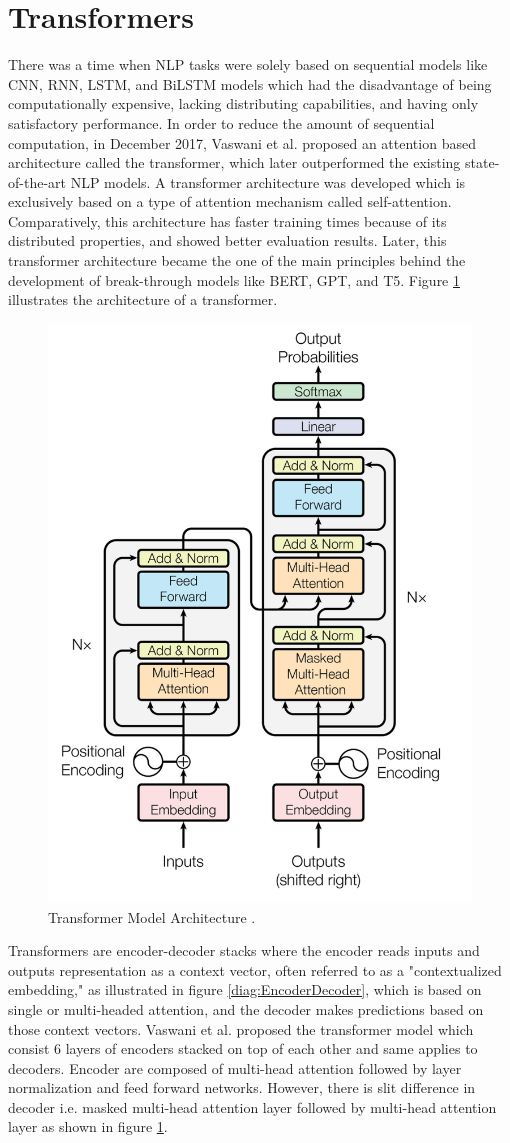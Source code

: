 \documentclass[%
	BCOR=8mm, %
	DIV=12,
	toc=bibliography, %
	toc=listof, %
	oneside, %
	egregdoesnotlikesansseriftitles, %
	]{scrbook}
\begin{document}
\section{Transformers}
\label{section: transformers}
There was a time when NLP tasks were solely based on sequential models like CNN, RNN, LSTM, and BiLSTM models which had the disadvantage of being computationally expensive, lacking distributing capabilities, and having only satisfactory performance. In order to reduce the amount of sequential computation, in December 2017, Vaswani et al. \cite{vaswani_attention_2017} proposed an attention based architecture called the transformer, which later outperformed the existing state-of-the-art NLP models. A transformer architecture was developed which is exclusively based on a type of attention mechanism called self-attention. Comparatively, this architecture has faster training times because of its distributed properties, and showed better evaluation results. 
Later, this transformer architecture became the one of the main principles behind the development of break-through models like BERT, GPT, and T5. Figure \ref{diag:TransformerArchitecture} illustrates the architecture of a transformer.

\begin{figure}[h!]
    \centering
    \includegraphics[width=.50\textwidth]{img/TransformerArchitecture.png}
    \caption[Architecture diagram of Transformer]{Transformer Model Architecture \cite{vaswani_attention_2017}.}
    \label{diag:TransformerArchitecture}
\end{figure}
Transformers are encoder-decoder stacks where the encoder reads inputs and outputs representation as a context vector, often referred to as a "contextualized embedding," as illustrated in figure \ref{diag:EncoderDecoder}, which is based on single or multi-headed attention, and the decoder makes predictions based on those context vectors. Vaswani et al. \cite{vaswani_attention_2017} proposed the  transformer model which consist 6 layers of encoders stacked on top of each other and same applies to decoders. Encoder are composed of multi-head attention followed by layer normalization and feed forward networks. However, there is slit difference in decoder i.e. masked multi-head attention layer followed by multi-head attention layer as shown in figure \ref{diag:TransformerArchitecture}.
\end{document}
